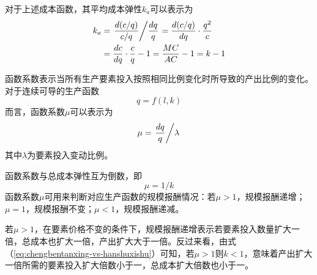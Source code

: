 对于上述成本函数，其平均成本弹性$k_a$可以表示为
\begin{equation}
\begin{split}
k_a &= \left. \frac{d(c/q)}{c/q} \middle/ \frac{dq}{q} \right. = \frac{d(c/q)}{dq} \cdot \frac{q^2}{c}\\
	&= \frac{dc}{dq} \cdot \frac{c}{q} -1 =  \frac{MC}{AC} -1 = k-1
\label{eq:average-cost-elasticity}
\end{split}
\end{equation}

函数系数表示当所有生产要素投入按照相同比例变化时所导致的产出比例的变化。对于连续可导的生产函数
\[
q=f(l,k)
\]
而言，函数系数$\mu$可以表示为
\begin{equation}
\mu = \left. \frac{dq}{q} \middle/ \lambda \right.
\label{eq:hanshuxishu}
\end{equation}
其中$\lambda$为要素投入变动比例。

函数系数与总成本弹性互为倒数，即
\begin{equation}
\mu = 1/ k
\label{eq:chengbentanxing-vs-hanshuxishu}
\end{equation}
函数系数$\mu$可用来判断对应生产函数的规模报酬情况：若$\mu > 1$，规模报酬递增；$\mu = 1$，规模报酬不变；$\mu < 1$，规模报酬递减。

若$\mu > 1$，在要素价格不变的条件下，规模报酬递增表示若要素投入数量扩大一倍，总成本也扩大一倍，产出扩大大于一倍。反过来看，由式（\ref{eq:chengbentanxing-vs-hanshuxishu}）可知，若$\mu > 1$则$k<1$，意味着产出扩大一倍所需的要素投入扩大倍数小于一，总成本扩大倍数也小于一。
